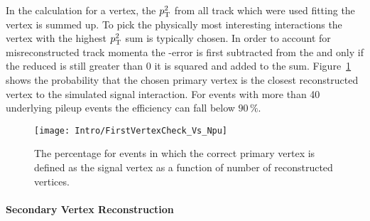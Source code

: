 In the calculation for a vertex, the $p_{\mathrm{T}}^{2}$ from all track which were used fitting the vertex is summed up. To pick the physically most interesting interactions the vertex with the highest $p_{\mathrm{T}}^{2}$ sum is typically chosen. In order to account for misreconstructed track momenta the \pt-error is first subtracted from the \pt and only if the reduced \pt is still greater than 0 it is squared and added to the sum. Figure~\ref{plot:IntroSigVertexProb} shows the probability that the chosen primary vertex is the closest reconstructed vertex to the simulated signal interaction. For events with more than 40 underlying pileup events the efficiency can fall below $90\,{}\%{}$.

\begin{figure}[!Hhtb]
    \centering
    \texttt{[image: Intro/FirstVertexCheck\_Vs\_Npu]}
    \caption[Probability to define the correct vertex as signal]{The percentage for events in which the correct primary vertex is defined as the signal vertex as a function of number of reconstructed vertices. \label{plot:IntroSigVertexProb}}
\end{figure}

\paragraph{Secondary Vertex Reconstruction \label{sec:LHCCMSSecVtx}}

